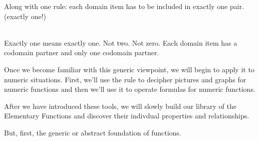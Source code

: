\documentclass{ximera}
\begin{document}
Along with one rule: each domain item has to be included in exactly one pair. (exactly one!)

\quad \\

Exactly one means exactly one.  Not two. Not zero. Each domain item has a codomain partner and only one codomain partner.

Once we become familiar with this generic viewpoint, we will begin to apply it to numeric situations.  First, we'll use the rule to decipher pictures and graphs for numeric functions and then we'll use it to operate formulas for numeric functions.

After we have introduced these tools, we will slowly build our library of the Elementary Functions and discover their indivdual properties and relationships.

But, first, the generic or abstract foundation of functions.
\end{document}
